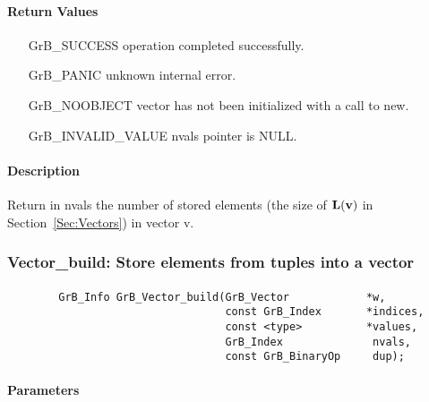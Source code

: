 \paragraph{Return Values}

\begin{itemize}[leftmargin=2.1in]
\item[{\sf GrB\_SUCCESS}]   operation completed successfully.
\item[{\sf GrB\_PANIC}]     unknown internal error.
\item[{\sf GrB\_NOOBJECT}]  vector has not been initialized with a call to {\sf new}.
\item[{\sf GrB\_INVALID\_VALUE}]    {\sf nvals} pointer is {\sf NULL}.
\end{itemize}

\paragraph{Description}

Return in {\sf nvals} the number of stored elements (the size of $\bold{L}({\bf v})$
in Section~\ref{Sec:Vectors}) in vector {\sf v}.


\subsubsection{{\sf Vector\_build}: Store elements from tuples into a vector}
\label{Sec:Vector_build}

\paragraph{\syntax}

\begin{verbatim}
        GrB_Info GrB_Vector_build(GrB_Vector            *w,
                                  const GrB_Index       *indices,
                                  const <type>          *values,
                                  GrB_Index              nvals,
                                  const GrB_BinaryOp     dup);
\end{verbatim}

\paragraph{Parameters}

